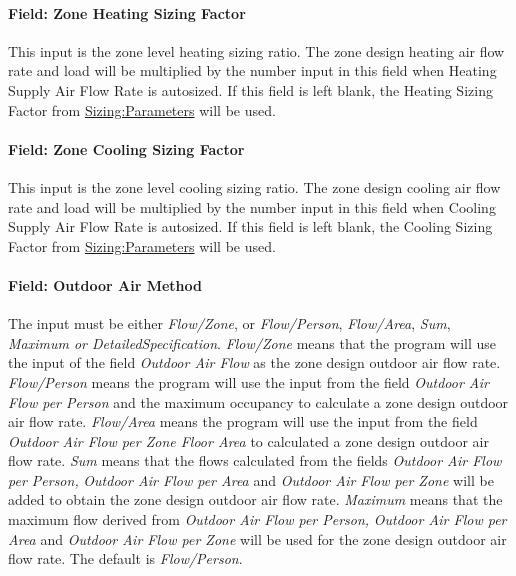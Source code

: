 \paragraph{Field: Zone Heating Sizing Factor}\label{field-zone-heating-sizing-factor-2}

This input is the zone level heating sizing ratio. The zone design heating air flow rate and load will be multiplied by the number input in this field when Heating Supply Air Flow Rate is autosized. If this field is left blank, the Heating Sizing Factor from \hyperref[sizingparameters]{Sizing:Parameters} will be used.

\paragraph{Field: Zone Cooling Sizing Factor}\label{field-zone-cooling-sizing-factor-1}

This input is the zone level cooling sizing ratio. The zone design cooling air flow rate and load will be multiplied by the number input in this field when Cooling Supply Air Flow Rate is autosized. If this field is left blank, the Cooling Sizing Factor from \hyperref[sizingparameters]{Sizing:Parameters} will be used.

\paragraph{Field: Outdoor Air Method}\label{field-outdoor-air-method-3}

The input must be either \emph{Flow/Zone}, or \emph{Flow/Person}, \emph{Flow/Area}, \emph{Sum}, \emph{Maximum or DetailedSpecification}. \emph{Flow/Zone} means that the program will use the input of the field \emph{Outdoor Air Flow} as the zone design outdoor air flow rate. \emph{Flow/Person} means the program will use the input from the field \emph{Outdoor Air Flow per Person} and the maximum occupancy to calculate a zone design outdoor air flow rate. \emph{Flow/Area} means the program will use the input from the field \emph{Outdoor Air Flow per Zone Floor Area} to calculated a zone design outdoor air flow rate. \emph{Sum} means that the flows calculated from the fields \emph{Outdoor Air Flow per Person,} \emph{Outdoor Air Flow per Area} and \emph{Outdoor Air Flow per Zone} will be added to obtain the zone design outdoor air flow rate. \emph{Maximum} means that the maximum flow derived from \emph{Outdoor Air Flow per Person,} \emph{Outdoor Air Flow per Area} and \emph{Outdoor Air Flow per Zone} will be used for the zone design outdoor air flow rate. The default is \emph{Flow/Person}.


